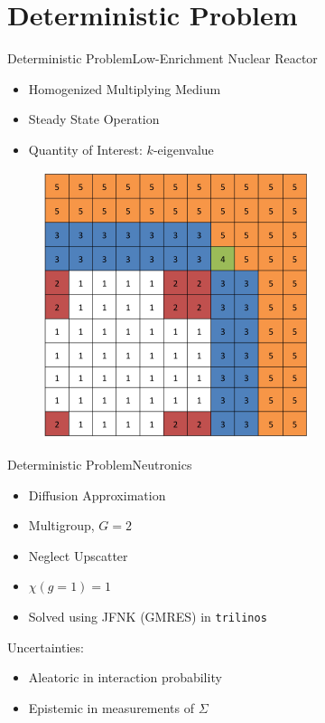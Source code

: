 \documentclass{beamer}
\begin{document}
\section{Deterministic Problem}
\begin{frame}{Deterministic Problem}{Low-Enrichment Nuclear Reactor}
\begin{itemize}
\item Homogenized Multiplying Medium
\item Steady State Operation
\item Quantity of Interest: $k$-eigenvalue
\end{itemize}
\begin{figure}
  \includegraphics[width=0.4\linewidth]{../graphics/core}
\end{figure}
\end{frame}

\begin{frame}{Deterministic Problem}{Neutronics}
\begin{itemize}\vspace{-30pt}
\item Diffusion Approximation
\item Multigroup, $G=2$
\item Neglect Upscatter
\item $\chi(g=1)=1$
\item Solved using JFNK (GMRES) in \texttt{trilinos}
\end{itemize}\vspace{10pt}
Uncertainties:
\begin{itemize}
\item Aleatoric in interaction probability
\item Epistemic in measurements of $\Sigma$
\end{itemize}
\end{frame}
\end{document}
